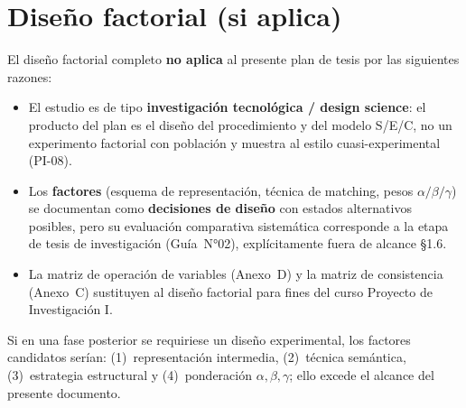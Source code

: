 \chapter{Diseño factorial (si aplica)}
\label{anexo:e}

El diseño factorial completo \textbf{no aplica} al presente plan de tesis por las siguientes
razones:

\begin{itemize}
  \item El estudio es de tipo \textbf{investigación tecnológica / design science}: el producto del
        plan es el diseño del procedimiento y del modelo S/E/C, no un experimento factorial con
        población y muestra al estilo cuasi-experimental (PI-08).
  \item Los \textbf{factores} (esquema de representación, técnica de matching, pesos
        $\alpha/\beta/\gamma$) se documentan como \textbf{decisiones de diseño} con estados
        alternativos posibles, pero su evaluación comparativa sistemática corresponde a la etapa de
        tesis de investigación (Guía~N°02), explícitamente fuera de alcance §1.6.
  \item La matriz de operación de variables (Anexo~D) y la matriz de consistencia (Anexo~C)
        sustituyen al diseño factorial para fines del curso Proyecto de Investigación I.
\end{itemize}

Si en una fase posterior se requiriese un diseño experimental, los factores candidatos serían:
(1)~representación intermedia, (2)~técnica semántica, (3)~estrategia estructural y
(4)~ponderación $\alpha,\beta,\gamma$; ello excede el alcance del presente documento.

